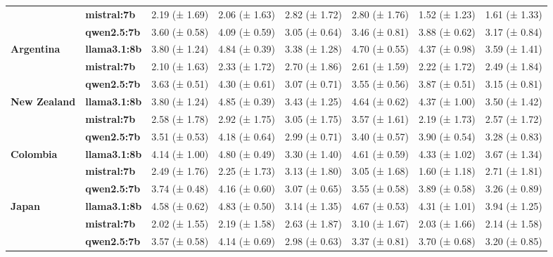 \begin{tabular}{llllllll}
\textbf{} & \textbf{mistral:7b} & 2.19 (± 1.69) & 2.06 (± 1.63) & 2.82 (± 1.72) & 2.80 (± 1.76) & 1.52 (± 1.23) & 1.61 (± 1.33) \\
\textbf{} & \textbf{qwen2.5:7b} & 3.60 (± 0.58) & 4.09 (± 0.59) & 3.05 (± 0.64) & 3.46 (± 0.81) & 3.88 (± 0.62) & 3.17 (± 0.84) \\
\cline{1-8}
\multirow[t]{3}{*}{\textbf{Argentina}} & \textbf{llama3.1:8b} & 3.80 (± 1.24) & 4.84 (± 0.39) & 3.38 (± 1.28) & 4.70 (± 0.55) & 4.37 (± 0.98) & 3.59 (± 1.41) \\
\textbf{} & \textbf{mistral:7b} & 2.10 (± 1.63) & 2.33 (± 1.72) & 2.70 (± 1.86) & 2.61 (± 1.59) & 2.22 (± 1.72) & 2.49 (± 1.84) \\
\textbf{} & \textbf{qwen2.5:7b} & 3.63 (± 0.51) & 4.30 (± 0.61) & 3.07 (± 0.71) & 3.55 (± 0.56) & 3.87 (± 0.51) & 3.15 (± 0.81) \\
\cline{1-8}
\multirow[t]{3}{*}{\textbf{New Zealand}} & \textbf{llama3.1:8b} & 3.80 (± 1.24) & 4.85 (± 0.39) & 3.43 (± 1.25) & 4.64 (± 0.62) & 4.37 (± 1.00) & 3.50 (± 1.42) \\
\textbf{} & \textbf{mistral:7b} & 2.58 (± 1.78) & 2.92 (± 1.75) & 3.05 (± 1.75) & 3.57 (± 1.61) & 2.19 (± 1.73) & 2.57 (± 1.72) \\
\textbf{} & \textbf{qwen2.5:7b} & 3.51 (± 0.53) & 4.18 (± 0.64) & 2.99 (± 0.71) & 3.40 (± 0.57) & 3.90 (± 0.54) & 3.28 (± 0.83) \\
\cline{1-8}
\multirow[t]{3}{*}{\textbf{Colombia}} & \textbf{llama3.1:8b} & 4.14 (± 1.00) & 4.80 (± 0.49) & 3.30 (± 1.40) & 4.61 (± 0.59) & 4.33 (± 1.02) & 3.67 (± 1.34) \\
\textbf{} & \textbf{mistral:7b} & 2.49 (± 1.76) & 2.25 (± 1.73) & 3.13 (± 1.80) & 3.05 (± 1.68) & 1.60 (± 1.18) & 2.71 (± 1.81) \\
\textbf{} & \textbf{qwen2.5:7b} & 3.74 (± 0.48) & 4.16 (± 0.60) & 3.07 (± 0.65) & 3.55 (± 0.58) & 3.89 (± 0.58) & 3.26 (± 0.89) \\
\cline{1-8}
\multirow[t]{3}{*}{\textbf{Japan}} & \textbf{llama3.1:8b} & 4.58 (± 0.62) & 4.83 (± 0.50) & 3.14 (± 1.35) & 4.67 (± 0.53) & 4.31 (± 1.01) & 3.94 (± 1.25) \\
\textbf{} & \textbf{mistral:7b} & 2.02 (± 1.55) & 2.19 (± 1.58) & 2.63 (± 1.87) & 3.10 (± 1.67) & 2.03 (± 1.66) & 2.14 (± 1.58) \\
\textbf{} & \textbf{qwen2.5:7b} & 3.57 (± 0.58) & 4.14 (± 0.69) & 2.98 (± 0.63) & 3.37 (± 0.81) & 3.70 (± 0.68) & 3.20 (± 0.85) \\
\cline{1-8}
\bottomrule
\end{tabular}
